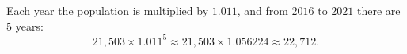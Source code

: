 Each year the population is multiplied by $1.011$, and from $2016$ to $2021$ there are $5$ years:
\[
21{,}503\times1.011^5\approx21{,}503\times1.056224\approx\boxed{22{,}712}.
\]
